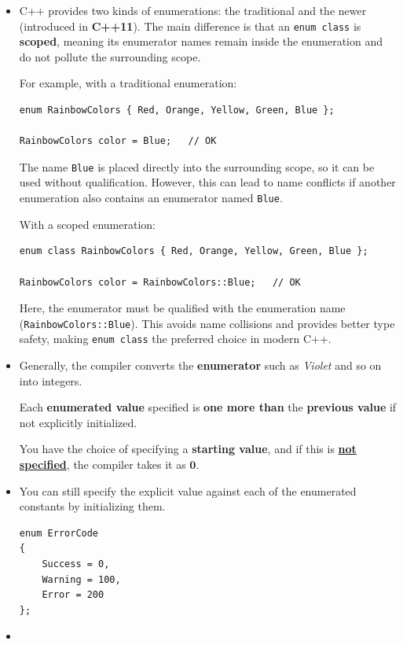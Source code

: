 \documentclass[10pt]{article}
\newcommand{\vocab}[1]{\fbox{\textbf{\textit{#1}}}}
\begin{document}
\begin{itemize}
\item C++ provides two kinds of enumerations: the traditional \vocab{enum} and the newer \vocab{enum class} (introduced in \textbf{C++11}). The main difference is that an \verb|enum class| is \textbf{scoped}, meaning its enumerator names remain inside the enumeration and do not pollute the surrounding scope.

For example, with a traditional enumeration:

\begin{verbatim}
enum RainbowColors { Red, Orange, Yellow, Green, Blue };

RainbowColors color = Blue;   // OK
\end{verbatim}

The name \verb|Blue| is placed directly into the surrounding scope, so it can be used without qualification. However, this can lead to name conflicts if another enumeration also contains an enumerator named \verb|Blue|.

With a scoped enumeration:

\begin{verbatim}
enum class RainbowColors { Red, Orange, Yellow, Green, Blue };

RainbowColors color = RainbowColors::Blue;   // OK
\end{verbatim}

Here, the enumerator must be qualified with the enumeration name (\verb|RainbowColors::Blue|). This avoids name collisions and provides better type safety, making \verb|enum class| the preferred choice in modern C++.\\ 

\item Generally, the compiler converts the \textbf{enumerator} such as \textit{Violet} and so on into integers.

	Each \textbf{enumerated value} specified is \textbf{one more than} the \textbf{previous value} if not explicitly initialized.

	You have the choice of specifying a \textbf{starting value}, and if this is \underline{\textbf{not specified}}, the compiler takes it as $\mathbf{0}$.

\item You can still specify the explicit value against each of the enumerated constants by initializing them.

	\begin{verbatim}
enum ErrorCode
{
    Success = 0,
    Warning = 100,
    Error = 200
};
\end{verbatim}

\item {}
\end{itemize}
\end{document}
